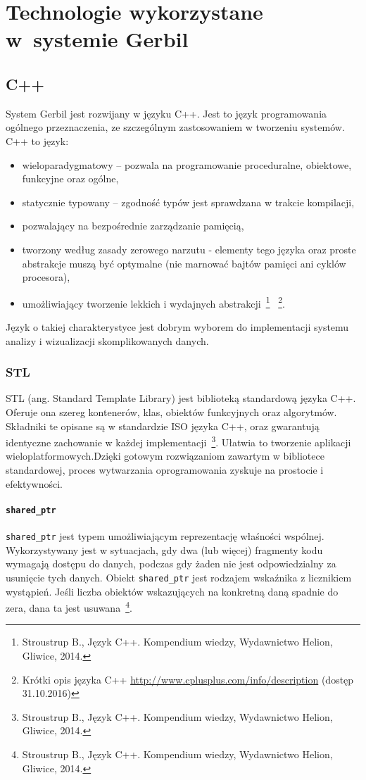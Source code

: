 \chapter{Technologie wykorzystane w~systemie Gerbil}

 \section{C++}
System Gerbil jest rozwijany w języku C++. Jest to język programowania ogólnego przeznaczenia, ze szczególnym zastosowaniem w tworzeniu systemów. C++ to język: 
\begin{itemize}
	\item wieloparadygmatowy -- pozwala na programowanie proceduralne, obiektowe, funkcyjne oraz ogólne,
	\item statycznie typowany -- zgodność typów jest sprawdzana w trakcie kompilacji,
	\item pozwalający na bezpośrednie zarządzanie pamięcią,
	\item tworzony według zasady zerowego narzutu - elementy tego języka oraz proste abstrakcje muszą być optymalne (nie marnować bajtów pamięci ani cyklów procesora),
	\item umożliwiający tworzenie lekkich i wydajnych abstrakcji~\footnote{Stroustrup B., Język C++. Kompendium wiedzy, Wydawnictwo Helion, Gliwice, 2014.}
	~\footnote{Krótki opis języka C++ \url{http://www.cplusplus.com/info/description} (dostęp 31.10.2016)}.
\end{itemize}

Język o takiej charakterystyce jest dobrym wyborem do implementacji systemu analizy i wizualizacji skomplikowanych danych.

 \subsection{STL}
STL (ang. Standard Template Library) jest biblioteką standardową języka C++. Oferuje ona szereg kontenerów, klas, obiektów funkcyjnych oraz algorytmów. Składniki te opisane są w standardzie ISO języka C++, oraz gwarantują identyczne zachowanie w każdej implementacji~\footnote{Stroustrup B., Język C++. Kompendium wiedzy, Wydawnictwo Helion, Gliwice, 2014.}. Ułatwia to tworzenie aplikacji wieloplatformowych.Dzięki gotowym rozwiązaniom zawartym w bibliotece standardowej, proces wytwarzania oprogramowania zyskuje na prostocie i efektywności. 

 \subsubsection{\lstinline$shared_ptr$}
\lstinline$shared_ptr$ jest typem umożliwiającym reprezentację właśności wspólnej. Wykorzystywany jest w sytuacjach, gdy dwa (lub więcej) fragmenty kodu wymagają dostępu do danych, podczas gdy żaden nie jest odpowiedzialny za usunięcie tych danych. Obiekt \lstinline$shared_ptr$ jest rodzajem wskaźnika z licznikiem wystąpień. Jeśli liczba obiektów wskazujących na konkretną daną spadnie do zera, dana ta jest usuwana~\footnote{Stroustrup B., Język C++. Kompendium wiedzy, Wydawnictwo Helion, Gliwice, 2014.}. 

